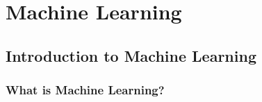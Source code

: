 \chapter{Machine Learning}
\section{Introduction to Machine Learning}

\subsection{What is Machine Learning?}

